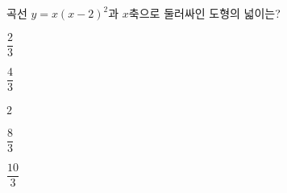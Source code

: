 곡선 $y=x(x-2)^2$과 $x$축으로 둘러싸인 도형의 넓이는?
\begin{choices32}{\rule[-3ex]{0pt}{8ex}$\dfrac{2}{3}$}{\rule[-3ex]{0pt}{8ex}$\dfrac{4}{3}$}{\rule[-3ex]{0pt}{8ex}$2$}{\rule[-3ex]{0pt}{8ex}$\dfrac{8}{3}$}{\rule[-3ex]{0pt}{8ex}$\dfrac{10}{3}$}\end{choices32}
